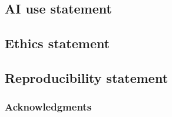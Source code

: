 \subsection*{AI use statement}

\subsection*{Ethics statement}

\subsection*{Reproducibility statement}

\subsubsection*{Acknowledgments}